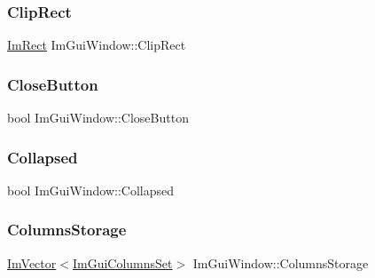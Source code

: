\hypertarget{struct_im_gui_window_a9950a40b18de2579c4d3deb0ab33f455}{}\label{struct_im_gui_window_a9950a40b18de2579c4d3deb0ab33f455} 
\subsubsection{\texorpdfstring{Clip\+Rect}{ClipRect}}
{\footnotesize\ttfamily \hyperlink{struct_im_rect}{Im\+Rect} Im\+Gui\+Window\+::\+Clip\+Rect}

\hypertarget{struct_im_gui_window_afef9f9e2a79626e28acd459e4cfe83e7}{}\label{struct_im_gui_window_afef9f9e2a79626e28acd459e4cfe83e7} 
\subsubsection{\texorpdfstring{Close\+Button}{CloseButton}}
{\footnotesize\ttfamily bool Im\+Gui\+Window\+::\+Close\+Button}

\hypertarget{struct_im_gui_window_a04e6b533b2401d1c7e78b47e31538e7b}{}\label{struct_im_gui_window_a04e6b533b2401d1c7e78b47e31538e7b} 
\subsubsection{\texorpdfstring{Collapsed}{Collapsed}}
{\footnotesize\ttfamily bool Im\+Gui\+Window\+::\+Collapsed}

\hypertarget{struct_im_gui_window_ac2ad7437b8960be8182ffde0788e1ec6}{}\label{struct_im_gui_window_ac2ad7437b8960be8182ffde0788e1ec6} 
\subsubsection{\texorpdfstring{Columns\+Storage}{ColumnsStorage}}
{\footnotesize\ttfamily \hyperlink{class_im_vector}{Im\+Vector}$<$\hyperlink{struct_im_gui_columns_set}{Im\+Gui\+Columns\+Set}$>$ Im\+Gui\+Window\+::\+Columns\+Storage}

\hypertarget{struct_im_gui_window_ac0d04b743eab132900c1ededc8eab9f6}{}\label{struct_im_gui_window_ac0d04b743eab132900c1ededc8eab9f6} 
